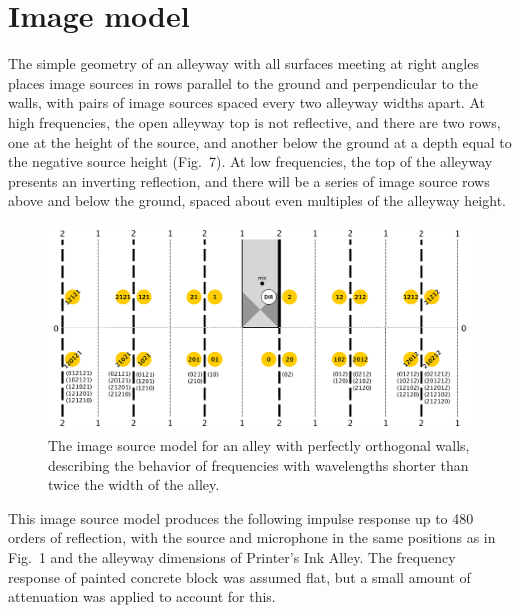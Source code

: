 \documentclass{aes137}
\begin{document}
\section{Image model}

The simple geometry of an alleyway with all surfaces meeting at right
angles places image sources in rows parallel to the ground and
perpendicular to the walls, with pairs of image sources spaced every
two alleyway widths apart. At high frequencies, the open alleyway top
is not reflective, and there are two rows, one at the height of the
source, and another below the ground at a depth equal to the negative
source height (Fig.~7). At low frequencies, the top of the alleyway
presents an inverting reflection, and there will be a series of image
source rows above and below the ground, spaced about even multiples of
the alleyway height.

\begin{figure}[h!] \centering \includegraphics[width=\linewidth]{images/ISM_uncanted.pdf} 
\caption{The image source model for an alley with perfectly orthogonal walls, describing the behavior of frequencies with wavelengths shorter than twice the width of the alley.} 
\end{figure}

This image source model produces the following impulse response up to 480 orders of reflection, with the source and microphone in the same positions as in Fig.~1 and the alleyway dimensions of Printer's Ink Alley. The frequency response of painted concrete block was assumed flat, but a small amount of attenuation was applied to account for this.
\end{document}
